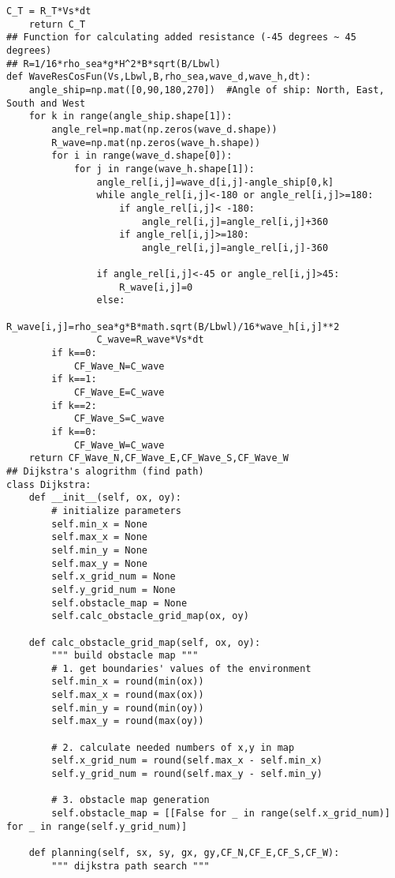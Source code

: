 \begin{lstlisting}[caption=Testing codes (\autoref{TestResults}), label=TestCodes]
    C_T = R_T*Vs*dt
    return C_T
## Function for calculating added resistance (-45 degrees ~ 45 degrees)
## R=1/16*rho_sea*g*H^2*B*sqrt(B/Lbwl)
def WaveResCosFun(Vs,Lbwl,B,rho_sea,wave_d,wave_h,dt):
    angle_ship=np.mat([0,90,180,270])  #Angle of ship: North, East, South and West
    for k in range(angle_ship.shape[1]):
        angle_rel=np.mat(np.zeros(wave_d.shape))
        R_wave=np.mat(np.zeros(wave_h.shape))
        for i in range(wave_d.shape[0]):
            for j in range(wave_h.shape[1]):
                angle_rel[i,j]=wave_d[i,j]-angle_ship[0,k]
                while angle_rel[i,j]<-180 or angle_rel[i,j]>=180:
                    if angle_rel[i,j]< -180:
                        angle_rel[i,j]=angle_rel[i,j]+360
                    if angle_rel[i,j]>=180:
                        angle_rel[i,j]=angle_rel[i,j]-360
                
                if angle_rel[i,j]<-45 or angle_rel[i,j]>45:
                    R_wave[i,j]=0
                else:
                    R_wave[i,j]=rho_sea*g*B*math.sqrt(B/Lbwl)/16*wave_h[i,j]**2
                C_wave=R_wave*Vs*dt
        if k==0:
            CF_Wave_N=C_wave
        if k==1:
            CF_Wave_E=C_wave
        if k==2:
            CF_Wave_S=C_wave
        if k==0:
            CF_Wave_W=C_wave
    return CF_Wave_N,CF_Wave_E,CF_Wave_S,CF_Wave_W
## Dijkstra's alogrithm (find path)
class Dijkstra:
    def __init__(self, ox, oy):
        # initialize parameters
        self.min_x = None
        self.max_x = None
        self.min_y = None
        self.max_y = None
        self.x_grid_num = None
        self.y_grid_num = None
        self.obstacle_map = None
        self.calc_obstacle_grid_map(ox, oy) 

    def calc_obstacle_grid_map(self, ox, oy):
        """ build obstacle map """
        # 1. get boundaries' values of the environment
        self.min_x = round(min(ox))
        self.max_x = round(max(ox))
        self.min_y = round(min(oy))
        self.max_y = round(max(oy))

        # 2. calculate needed numbers of x,y in map
        self.x_grid_num = round(self.max_x - self.min_x)
        self.y_grid_num = round(self.max_y - self.min_y)

        # 3. obstacle map generation
        self.obstacle_map = [[False for _ in range(self.x_grid_num)] for _ in range(self.y_grid_num)]

    def planning(self, sx, sy, gx, gy,CF_N,CF_E,CF_S,CF_W):
        """ dijkstra path search """


\end{lstlisting}
